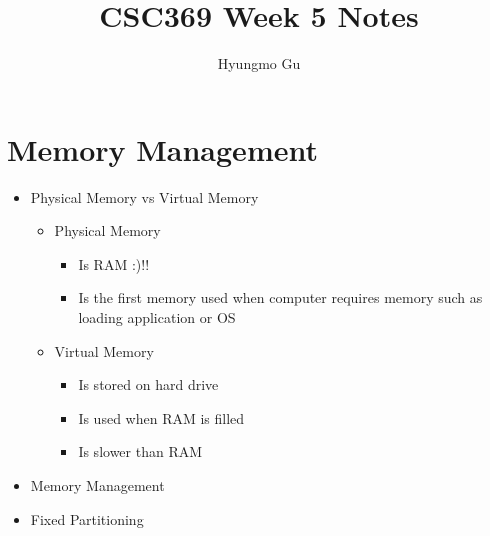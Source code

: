 \documentclass[12pt]{article}
\begin{document}
\title{CSC369 Week 5 Notes}
\author{Hyungmo Gu}
\maketitle

\bigskip

\section{Memory Management}

\begin{itemize}
    \item Physical Memory vs Virtual Memory
    \begin{itemize}
        \item Physical Memory
        \begin{itemize}
            \item Is RAM :)!!
            \item Is the first memory used when computer requires memory such as
            loading application or OS
        \end{itemize}
        \item Virtual Memory
        \begin{itemize}
            \item Is stored on hard drive
            \item Is used when RAM is filled
            \item Is slower than RAM
        \end{itemize}
    \end{itemize}
    \item Memory Management
    \item Fixed Partitioning

\end{itemize}
\end{document}
